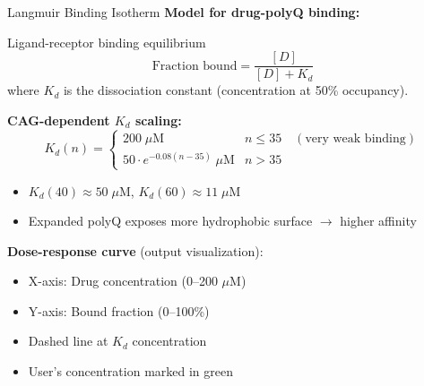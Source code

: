 \documentclass[aspectratio=169,11pt]{beamer}
\begin{document}
\begin{frame}{Langmuir Binding Isotherm}
    \textbf{Model for drug-polyQ binding:}

    \begin{block}{Ligand-receptor binding equilibrium}
        \[
        \text{Fraction bound} = \frac{[D]}{[D] + K_d}
        \]
        where $K_d$ is the dissociation constant (concentration at 50\% occupancy).
    \end{block}

    \textbf{CAG-dependent $K_d$ scaling:}
    \[
    K_d(n) =
    \begin{cases}
        200\;\mu\text{M} & n \le 35 \quad (\text{very weak binding}) \\
        50 \cdot e^{-0.08(n-35)}\;\mu\text{M} & n > 35
    \end{cases}
    \]

    \begin{itemize}
        \item $K_d(40) \approx 50\;\mu\text{M}$, $K_d(60) \approx 11\;\mu\text{M}$
        \item Expanded polyQ exposes more hydrophobic surface $\to$ higher affinity
    \end{itemize}

    \textbf{Dose-response curve} (output visualization):
    \begin{itemize}
        \item X-axis: Drug concentration (0--200 $\mu$M)
        \item Y-axis: Bound fraction (0--100\%)
        \item Dashed line at $K_d$ concentration
        \item User's concentration marked in green
    \end{itemize}
\end{frame}
\end{document}
